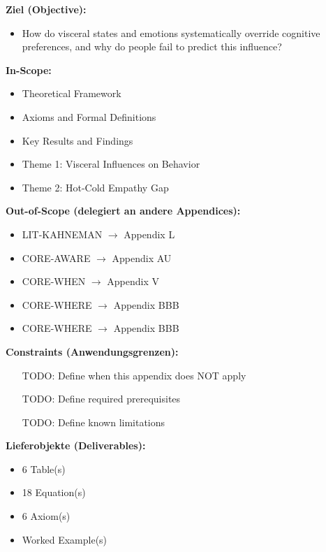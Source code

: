 \begin{tcolorbox}[
    colback=orange!5!white,
    colframe=orange!75!black,
    title={\textbf{Appendix Scope: Ziel / In-Scope / Out-of-Scope / Constraints}},
    fonttitle=\bfseries
]

\textbf{Ziel (Objective):}
\begin{itemize}[nosep]
    \item How do visceral states and emotions systematically override cognitive preferences, and why do people fail to predict this influence?
\end{itemize}

\textbf{In-Scope:}
\begin{itemize}[nosep]
    \item Theoretical Framework
    \item Axioms and Formal Definitions
    \item Key Results and Findings
    \item Theme 1: Visceral Influences on Behavior
    \item Theme 2: Hot-Cold Empathy Gap
\end{itemize}

\textbf{Out-of-Scope (delegiert an andere Appendices):}
\begin{itemize}[nosep]
    \item LIT-KAHNEMAN $\rightarrow$ Appendix L
    \item CORE-AWARE $\rightarrow$ Appendix AU
    \item CORE-WHEN $\rightarrow$ Appendix V
    \item CORE-WHERE $\rightarrow$ Appendix BBB
    \item CORE-WHERE $\rightarrow$ Appendix BBB
\end{itemize}

\textbf{Constraints (Anwendungsgrenzen):}
\begin{itemize}[nosep]
    \item [TODO: Define when this appendix does NOT apply]
    \item [TODO: Define required prerequisites]
    \item [TODO: Define known limitations]
\end{itemize}

\textbf{Lieferobjekte (Deliverables):}
\begin{itemize}[nosep]
    \item 6 Table(s)
    \item 18 Equation(s)
    \item 6 Axiom(s)
    \item Worked Example(s)
\end{itemize}

\end{tcolorbox}




